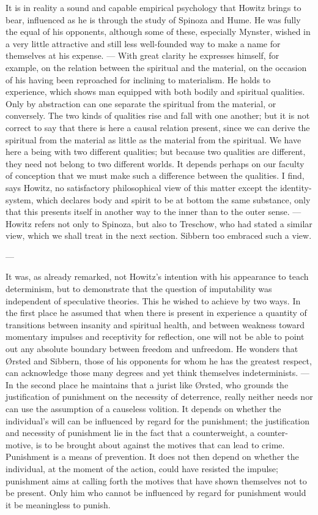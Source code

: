 \documentclass[12pt,a4paper]{book}
\newcommand{\opage}[1]{\marginnote{\footnotesize\textit{[#1]}}}
\begin{document}
It is in reality a sound and capable empirical psychology that Howitz brings to bear,
influenced as he is through the study of Spinoza and Hume. He was fully the equal of his
opponents, although some of these, especially Mynster, wished in a very little attractive
and still less well-founded way to make a name for themselves at his expense. --- With
great clarity he expresses himself, for example, on the relation between the spiritual and
the material, on the occasion of his having been reproached for inclining to materialism.
He holds to experience, which shows man equipped with both bodily and spiritual qualities.
Only by abstraction can one separate the spiritual from the material, or conversely. The
two kinds of qualities rise and fall with one another; but it is not correct to say that
there is here a causal relation present, since we can derive the spiritual from the
material as little as the material from the spiritual. We have here a being with two
different qualities; but because two qualities are different, they need not belong to two
different worlds. It \opage{86}depends perhaps on our faculty of conception that we must make such a
difference between the qualities. I find, says Howitz, no satisfactory philosophical view
of this matter except the identity-system, which declares body and spirit to be at bottom
the same substance, only that this presents itself in another way to the inner than to the
outer sense. --- Howitz refers not only to Spinoza, but also to Treschow, who had stated a
similar view, which we shall treat in the next section. Sibbern too embraced such a view.

\begin{center}---\end{center}

It was, as already remarked, not Howitz's intention with his appearance to teach
determinism, but to demonstrate that the question of imputability was independent of
speculative theories. This he wished to achieve by two ways. In the first place he assumed
that when there is present in experience a quantity of transitions between insanity and
spiritual health, and between weakness toward momentary impulses and receptivity for
reflection, one will not be able to point out any absolute boundary between freedom and
unfreedom. He wonders that Ørsted and Sibbern, those of his opponents for whom he has the
greatest respect, can acknowledge those many degrees and yet think themselves
indeterminists. --- In the second place he maintains that a jurist like Ørsted, who grounds
the justification of punishment on the necessity of deterrence, really neither needs nor
can use the assumption of a causeless volition. It depends on whether the individual's will
can be influenced by regard for the punishment; the justification and necessity of
punishment lie in the fact that a counterweight, a counter-motive, is to be brought about
against the motives that can lead to crime. Punishment is a means of prevention. It does
not then depend on whether the individual, at the moment of the action, could have resisted
the impulse; punishment aims at calling forth the motives that have shown themselves not to
be present. \opage{87}Only him who cannot be influenced by regard for punishment would it be
meaningless to punish.
\end{document}
